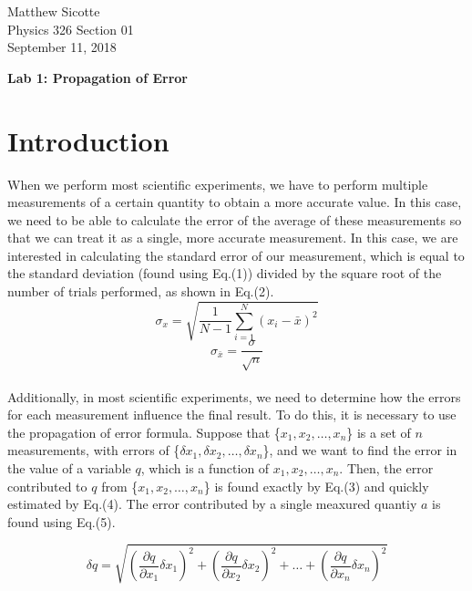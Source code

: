 \documentclass[12pt, leqno]{article}
\begin{document}
\begin{flushright}
Matthew Sicotte\\
Physics 326 Section 01\\
September 11, 2018
\end{flushright}
\begin{center}
	{\large \bf Lab 1: Propagation of Error}
\end{center}
\section*{Introduction}
When we perform most scientific experiments, we have to perform multiple measurements of a certain quantity to obtain a more accurate value.  In this case, we need to be able to calculate the error of the average of these measurements so that we can treat it as a single, more accurate measurement.  In this case, we are interested in calculating the standard error of our measurement, which is equal to the standard deviation (found using Eq.(1)) divided by the square root of the number of trials performed, as shown in Eq.(2).  
\begin{equation}
	\sigma_x=\sqrt{\frac{1}{N-1}\sum_{i=1}^{N} (x_i-\bar{x})^2}
\end{equation}
\begin{equation}
	\sigma_{\bar{x}}=\frac{\sigma}{\sqrt{n}}
\end{equation}\\

Additionally, in most scientific experiments, we need to determine how the errors for each measurement influence the final result.  To do this, it is necessary to use the propagation of error formula.  Suppose that \{$x_1, x_2, \ldots, x_n$\} is a set of $n$ measurements, with errors of \{$\delta x_1, \delta x_2, \ldots, \delta x_n$\}, and we want to find the error in the value of a variable $q$, which is a function of $x_1, x_2, \ldots, x_n$.  Then, the error contributed to $q$ from \{$x_1, x_2, \ldots, x_n$\} is found exactly by Eq.(3) and quickly estimated by Eq.(4).  The error contributed by a single meaxured quantiy $a$ is found using Eq.(5). 


\begin{equation}
	\delta q=\sqrt{(\frac{\partial q}{\partial x_1}\delta x_1)^2+(\frac{\partial q}{\partial x_2}\delta x_2)^2+\ldots+(\frac{\partial q}{\partial x_n}\delta x_n)^2}
\end{equation}
\end{document}
